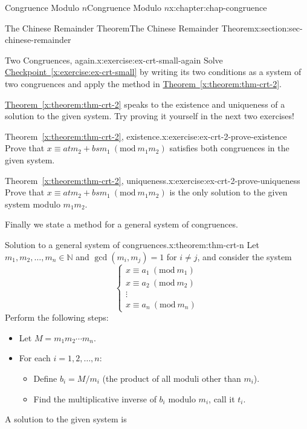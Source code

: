 \documentclass[oneside,10pt,]{book}
\newcommand{\xreffont}{\relax}
\numberwithin{equation}{section}
\newcommand{\Mod}[1]{\ \left(\mathrm{mod}\ #1\right)}
\begin{document}
\begin{chapterptx}{Congruence Modulo \(n\)}{}{Congruence Modulo \(n\)}{}{}{x:chapter:chap-congruence}
\begin{sectionptx}{The Chinese Remainder Theorem}{}{The Chinese Remainder Theorem}{}{}{x:section:sec-chinese-remainder}
\begin{inlineexercise}{Two Congruences, again.}{x:exercise:ex-crt-small-again}
Solve \hyperref[x:exercise:ex-crt-small]{Checkpoint~{\xreffont\ref{x:exercise:ex-crt-small}}} by writing its two conditions as a system of two congruences and apply the method in \hyperref[x:theorem:thm-crt-2]{Theorem~{\xreffont\ref{x:theorem:thm-crt-2}}}.%
\end{inlineexercise}
\hyperref[x:theorem:thm-crt-2]{Theorem~{\xreffont\ref{x:theorem:thm-crt-2}}} speaks to the existence and uniqueness of a solution to the given system. Try proving it yourself in the next two exercises!%
\begin{inlineexercise}{Theorem~{\xreffont\ref*{x:theorem:thm-crt-2}}, existence.}{x:exercise:ex-crt-2-prove-existence}%
Prove that \(x \equiv atm_2 + bsm_1 \Mod{m_1m_2}\) satisfies both congruences in the given system.%
\end{inlineexercise}
\begin{inlineexercise}{Theorem~{\xreffont\ref*{x:theorem:thm-crt-2}}, uniqueness.}{x:exercise:ex-crt-2-prove-uniqueness}%
Prove that \(x \equiv atm_2 + bsm_1 \Mod{m_1m_2}\) is the only solution to the given system modulo \(m_1m_2\).%
\end{inlineexercise}
Finally we state a method for a general system of congruences.%
\begin{theorem}{Solution to a general system of congruences.}{}{x:theorem:thm-crt-n}%
Let \(m_1,m_2,\ldots,m_n \in \mathbb{N}\) and \(\gcd(m_i,m_j) = 1\) for \(i \ne j\), and consider the system%
\begin{equation*}
\begin{cases} x \equiv a_1 \Mod{m_1} \\ x \equiv a_2 \Mod{m_2} \\ \vdots \\ x \equiv a_n \Mod{m_n} \end{cases}
\end{equation*}
Perform the following steps:%
\begin{itemize}[label=\textbullet]
\item{}Let \(M = m_1m_2\cdots m_n\).%
\item{}For each \(i = 1,2,\ldots,n\):%
\begin{itemize}[label=$\circ$]
\item{}Define \(b_i = M/m_i\) (the product of all moduli other than \(m_i\)).%
\item{}Find the multiplicative inverse of \(b_i\) modulo \(m_i\), call it \(t_i\).%
\end{itemize}
%
\end{itemize}
A solution to the given system is%

\end{theorem}
\end{sectionptx}
\end{chapterptx}
\end{document}
